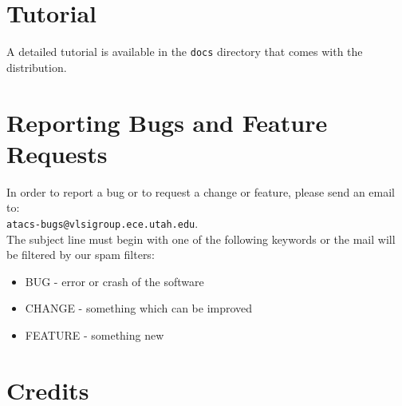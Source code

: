 \documentclass[titlepage,11pt]{article}
\begin{document}
\section{Tutorial}

\noindent
A detailed 
tutorial
is available in the {\tt docs} directory that comes with the distribution.

\section{Reporting Bugs and Feature Requests}

\noindent
In order to report a bug or to request a change or feature, please
send an email to:\\ 
{\tt atacs-bugs@vlsigroup.ece.utah.edu}.\\
The subject line must begin with one of the following keywords or the
mail will be filtered by our spam filters:
\begin{itemize}
\item BUG - error or crash of the software
\item CHANGE - something which can be improved
\item FEATURE - something new
\end{itemize}

\section{Credits}
\end{document}
